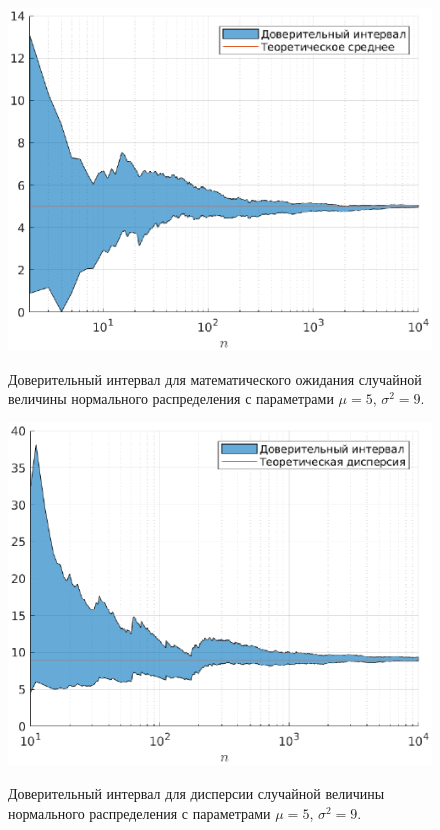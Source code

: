 \begin{figure}[t]
        \noindent
        \centering
        {
                \includegraphics[width=120mm]{task_05/mu-interval.eps}
        }
        \caption{Доверительный интервал для математического ожидания случайной величины нормального распределения с параметрами $\mu = 5$, $\sigma^2 = 9$.}
\end{figure}
\begin{figure}[b]
        \noindent
        \centering
        {
                \includegraphics[width=120mm]{task_05/sigma-interval.eps}
        }
        \caption{Доверительный интервал для дисперсии случайной величины нормального распределения с параметрами $\mu = 5$, $\sigma^2 = 9$.}
\end{figure}
